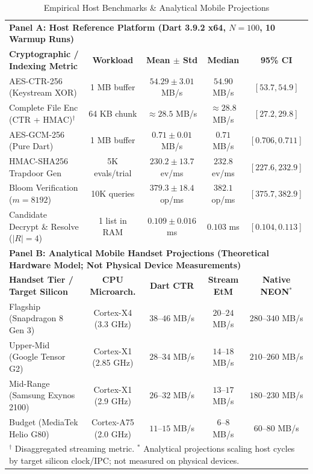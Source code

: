 \documentclass[10pt,conference]{IEEEtran}
\newenvironment{revised}{\color{revcolor}}{}
\newenvironment{revised}{\color{revcolor}}{}
\begin{document}
\begin{revised}
\begin{table}[t]
\centering
\caption{Empirical Host Benchmarks \& Analytical Mobile Projections}
\label{tab:benchmarks}
\fontsize{6.0pt}{6.7pt}\selectfont
\setlength{\tabcolsep}{2.5pt}
\renewcommand{\arraystretch}{0.68}
\begin{tabular}{lcccc}
\toprule
\multicolumn{5}{l}{\textbf{Panel A: Host Reference Platform (Dart 3.9.2 x64, $N=100$, 10 Warmup Runs)}} \\
\textbf{Cryptographic / Indexing Metric} & \textbf{Workload} & \textbf{Mean $\pm$ Std} & \textbf{Median} & \textbf{95\% CI} \\
\midrule
AES-CTR-256 (Keystream XOR) & 1 MB buffer & $54.29 \pm 3.01$ MB/s & $54.90$ MB/s & $[53.7, 54.9]$ \\
Complete File Enc (CTR + HMAC)$^\dagger$ & 64 KB chunk & $\approx 28.5$ MB/s & $\approx 28.8$ MB/s & $[27.2, 29.8]$ \\
AES-GCM-256 (Pure Dart) & 1 MB buffer & $0.71 \pm 0.01$ MB/s & $0.71$ MB/s & $[0.706, 0.711]$ \\
HMAC-SHA256 Trapdoor Gen & 5K evals/trial & $230.2 \pm 13.7$ ev/ms & $232.8$ ev/ms & $[227.6, 232.9]$ \\
Bloom Verification ($m=8192$) & 10K queries & $379.3 \pm 18.4$ op/ms & $382.1$ op/ms & $[375.7, 382.9]$ \\
Candidate Decrypt \& Resolve ($|R|=4$) & 1 list in RAM & $0.109 \pm 0.016$ ms & $0.103$ ms & $[0.104, 0.113]$ \\
\midrule
\multicolumn{5}{l}{\textbf{Panel B: Analytical Mobile Handset Projections (Theoretical Hardware Model; Not Physical Device Measurements)}} \\
\textbf{Handset Tier / Target Silicon} & \textbf{CPU Microarch.} & \textbf{Dart CTR} & \textbf{Stream EtM} & \textbf{Native NEON}$^*$ \\
\midrule
Flagship (Snapdragon 8 Gen 3) & Cortex-X4 (3.3 GHz) & $38$--$46$ MB/s & $20$--$24$ MB/s & $280$--$340$ MB/s \\
Upper-Mid (Google Tensor G2) & Cortex-X1 (2.85 GHz) & $28$--$34$ MB/s & $14$--$18$ MB/s & $210$--$260$ MB/s \\
Mid-Range (Samsung Exynos 2100) & Cortex-X1 (2.9 GHz) & $26$--$32$ MB/s & $13$--$17$ MB/s & $180$--$230$ MB/s \\
Budget (MediaTek Helio G80) & Cortex-A75 (2.0 GHz) & $11$--$15$ MB/s & $6$--$8$ MB/s & $60$--$80$ MB/s \\
\bottomrule
\multicolumn{5}{l}{\fontsize{5.6pt}{6.4pt}\selectfont $^\dagger$ Disaggregated streaming metric. $^*$ Analytical projections scaling host cycles by target silicon clock/IPC; not measured on physical devices.}
\end{tabular}
\end{table}




\end{revised}
\end{document}
